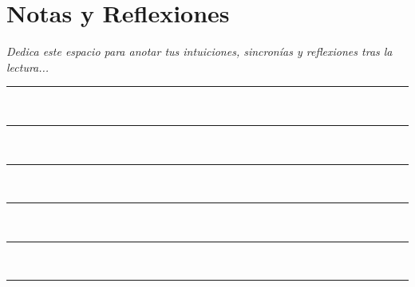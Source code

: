 \documentclass[12pt,twoside,openright]{book}
\begin{document}
\tableofcontents
\cleardoublepage

\mainmatter


\cleardoublepage


\cleardoublepage


\cleardoublepage


\cleardoublepage


\cleardoublepage


\cleardoublepage


\cleardoublepage


\cleardoublepage


\cleardoublepage


\cleardoublepage


\cleardoublepage


\cleardoublepage


\cleardoublepage


\cleardoublepage


\cleardoublepage


\cleardoublepage


\cleardoublepage


\cleardoublepage



\backmatter

\cleardoublepage
\thispagestyle{plain}
\chapter*{Notas y Reflexiones}

\vspace{1cm}
\textit{Dedica este espacio para anotar tus intuiciones, sincronías y reflexiones tras la lectura...}

\vspace{1.5cm}
\noindent\rule{\textwidth}{0.4pt}\\[1.5cm]
\noindent\rule{\textwidth}{0.4pt}\\[1.5cm]
\noindent\rule{\textwidth}{0.4pt}\\[1.5cm]
\noindent\rule{\textwidth}{0.4pt}\\[1.5cm]
\noindent\rule{\textwidth}{0.4pt}\\[1.5cm]
\noindent\rule{\textwidth}{0.4pt}
\end{document}
